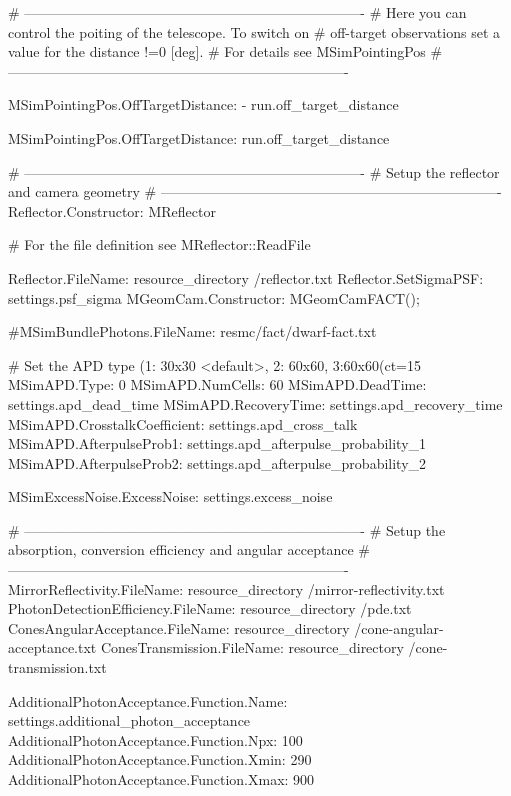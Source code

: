 # -------------------------------------------------------------------------
# Here you can control the poiting of the telescope. To switch on
# off-target observations set a value for the distance !=0 [deg].
# For details see MSimPointingPos
# -------------------------------------------------------------------------
{%
MSimPointingPos.OffTargetDistance: -{{ run.off_target_distance }}
{%
MSimPointingPos.OffTargetDistance: {{ run.off_target_distance }}
{%


# -------------------------------------------------------------------------
# Setup the reflector and camera geometry
# -------------------------------------------------------------------------
Reflector.Constructor: MReflector

# For the file definition see MReflector::ReadFile

Reflector.FileName: {{ resource_directory }}/reflector.txt
Reflector.SetSigmaPSF: {{ settings.psf_sigma }}
MGeomCam.Constructor:   MGeomCamFACT();

#MSimBundlePhotons.FileName: resmc/fact/dwarf-fact.txt

# Set the APD type (1: 30x30 <default>, 2: 60x60, 3:60x60(ct=15%
MSimAPD.Type:                   0
MSimAPD.NumCells:               60
MSimAPD.DeadTime:               {{ settings.apd_dead_time }}
MSimAPD.RecoveryTime:           {{ settings.apd_recovery_time }}
MSimAPD.CrosstalkCoefficient:   {{ settings.apd_cross_talk }}
MSimAPD.AfterpulseProb1:        {{ settings.apd_afterpulse_probability_1 }}
MSimAPD.AfterpulseProb2:        {{ settings.apd_afterpulse_probability_2 }}

MSimExcessNoise.ExcessNoise:    {{ settings.excess_noise }}

# -------------------------------------------------------------------------
# Setup the absorption, conversion efficiency and angular acceptance
# -------------------------------------------------------------------------
MirrorReflectivity.FileName: {{ resource_directory }}/mirror-reflectivity.txt
PhotonDetectionEfficiency.FileName: {{ resource_directory }}/pde.txt
ConesAngularAcceptance.FileName: {{ resource_directory }}/cone-angular-acceptance.txt
ConesTransmission.FileName: {{ resource_directory }}/cone-transmission.txt

AdditionalPhotonAcceptance.Function.Name: {{ settings.additional_photon_acceptance }}
AdditionalPhotonAcceptance.Function.Npx:  100
AdditionalPhotonAcceptance.Function.Xmin: 290
AdditionalPhotonAcceptance.Function.Xmax: 900

}}}
